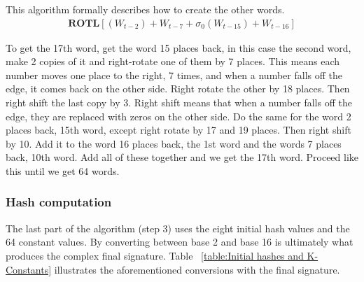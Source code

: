         
        This algorithm formally describes how to create the other words. 
        \begin{gather}
             \textbf{ROTL} [(W_{t-2}) + W_{t-7} + \sigma_0(W_{t-15}) + W_{t-16}]
        \end{gather}
        
        
        To get the 17th word, get the word 15 places back, in this case the second word, make 2 copies of it and right-rotate one of them by 7 places. This means each number moves one place to the right, 7 times, and when a number falls off the edge, it comes back on the other side. Right rotate the other by 18 places. Then right shift the last copy by 3. Right shift means that when a number falls off the edge, they are replaced with zeros on the other side. Do the same for the word 2 places back, 15th word, except right rotate by 17 and 19 places. Then right shift by 10. Add it to the word 16 places back, the 1st word and the words 7 places back, 10th word. Add all of these together and we get the 17th word. Proceed like this until we get 64 words. 
        
        \subsubsection{ Hash computation}
        
        The last part of the algorithm (step 3) uses the eight initial hash values and the 64 constant values. By converting between base 2 and base 16 is ultimately what produces the complex final signature. Table ~\ref{table:Initial hashes and K-Constants} illustrates the aforementioned conversions with the final signature.
        
        
            
